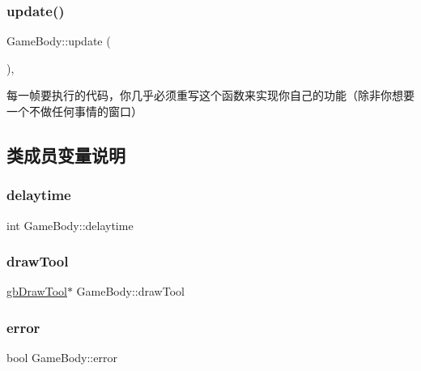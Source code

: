\subsubsection{\texorpdfstring{update()}{update()}}
{\footnotesize\ttfamily Game\+Body\+::update (\begin{DoxyParamCaption}{ }\end{DoxyParamCaption})\hspace{0.3cm}{\ttfamily [inline]}, {\ttfamily [virtual]}}



每一帧要执行的代码，你几乎必须重写这个函数来实现你自己的功能（除非你想要一个不做任何事情的窗口） 



\subsection{类成员变量说明}
\mbox{\label{class_game_body_a7a92a21e03a1032a60fa925d21d4a54a}} 
\subsubsection{\texorpdfstring{delaytime}{delaytime}}
{\footnotesize\ttfamily int Game\+Body\+::delaytime\hspace{0.3cm}{\ttfamily [protected]}}

\mbox{\label{class_game_body_a009989bbf848a759a89ed782a9615452}} 
\subsubsection{\texorpdfstring{drawTool}{drawTool}}
{\footnotesize\ttfamily \mbox{\hyperlink{classgb_draw_tool}{gb\+Draw\+Tool}}$\ast$ Game\+Body\+::draw\+Tool\hspace{0.3cm}{\ttfamily [protected]}}

\mbox{\label{class_game_body_a82d0d6fedddd6b802691d3b35e699141}} 
\subsubsection{\texorpdfstring{error}{error}}
{\footnotesize\ttfamily bool Game\+Body\+::error\hspace{0.3cm}{\ttfamily [protected]}}

